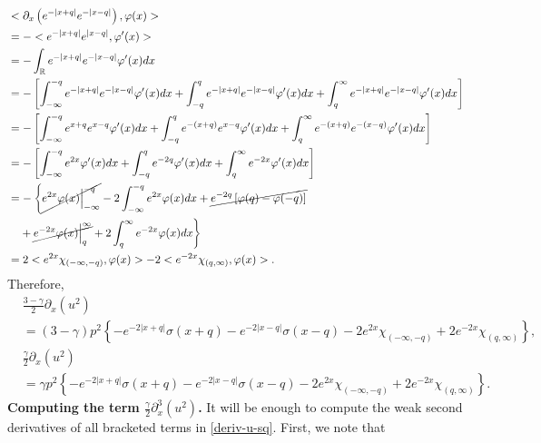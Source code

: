 \documentclass[12pt,reqno]{amsart}
\numberwithin{equation}{section}  %
\numberwithin{figure}{section}
\newcommand{\rr}{\mathbb{R}}
\newcommand{\p}{\partial}
\newcommand{\vp}{\varphi}
\theoremstyle{plain}  %
\theoremstyle{definition}
\begin{document}
%
%
%
%
\begin{equation*}
  \begin{split}
    & <\p_x\left( e^{-| x+q |}e^{-| x-q |}\right), \vp(x)>
    \\
    & = - <e^{-| x+q |} e^{| x-q |}, \vp'(x)>
    \\
    & = - \int_{\rr}e^{-| x+q |}e^{-| x-q |}\vp'(x) dx
    \\
    & = - \left[ \int_{-\infty}^{-q}e^{-| x+q |}e^{-| x-q |} \vp'(x) dx +
    \int_{-q}^{q}e^{-| x+q |}e^{-| x-q |} \vp'(x) dx +
    \int_{q}^{\infty}e^{-| x+q |}e^{-| x-q |}\vp'(x) dx \right]
    \\
    & = -\left[ \int_{-\infty}^{-q}e^{x+q}e^{x-q} \vp'(x) dx +
    \int_{-q}^{q}e^{-(x+q)}e^{x-q}\vp'(x) dx +
    \int_{q}^{\infty}e^{-(x+q)}e^{-(x-q)} \vp'(x) dx \right]
    \\
    & = -\left[ \int_{-\infty}^{-q}e^{2x}\vp'(x) dx +
    \int_{-q}^{q}e^{-2q}\vp'(x) dx + \int_{q}^{\infty}e^{-2x} \vp'(x) dx \right]
    \\
    & = -\left\{ \cancel{e^{2x} \vp(x) \Big |_{-\infty}^{-q}} -2 \int_{-\infty}^{-q}
    e^{2x} \vp(x) dx + \cancel{e^{-2q}\left[ \vp(q) - \vp(-q)
    \right]} \right.
    \\
    & \left . \phantom{=} + \cancel{e^{-2x}\vp(x) \Big |_{q}^{\infty}} + 2
    \int_{q}^{\infty}e^{-2x}\vp(x) dx \right\}
    \\
    & = 2 <e^{2x}\chi_{(-\infty, -q)}, \vp(x)>
    - 2 <e^{-2x}\chi_{(q, \infty)}, \vp(x)>.
  \end{split}
\end{equation*}
%
%
Therefore,
%
%
\begin{equation}
  \label{deriv-u-sq}
  \begin{split}
    & \frac{3-\gamma}{2}\p_x (u^{2}) 
    \\
    & = (3-\gamma) p^{2}\left\{ - e^{-2| x+q |} \sigma(x+q) -  e^{-2| x-q
    |}\sigma(x-q) - 2e^{2x}\chi_{(-\infty, -q)} + 2e^{-2x} \chi_{(q, \infty)}
    \right \},
    \\
    & \frac{\gamma}{2}\p_x (u^{2}) 
    \\
    & = \gamma p^{2}\left\{ - e^{-2| x+q |} \sigma(x+q) -  e^{-2| x-q
    |}\sigma(x-q) - 2e^{2x}\chi_{(-\infty, -q)} + 2e^{-2x} \chi_{(q, \infty)}
    \right \}.
  \end{split}
\end{equation}
%
{\bf Computing the term $\displaystyle \frac{\gamma}{2} \p_x^3 (u^2)$.}
It will be enough  
to compute the weak second derivatives of all
bracketed terms in \eqref{deriv-u-sq}. First, we note that
\end{document}
